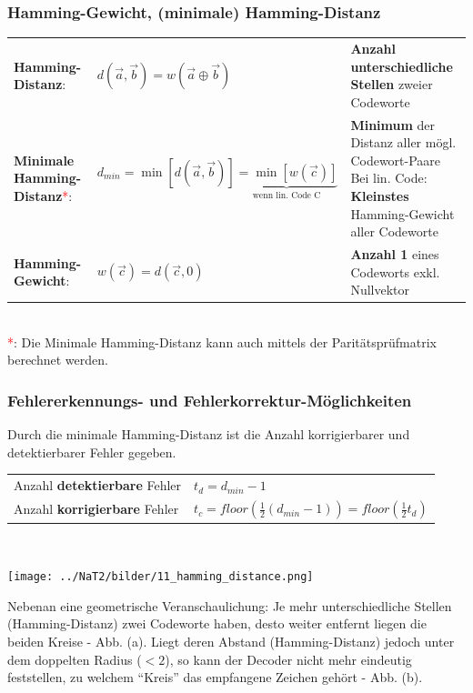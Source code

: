\subsubsection{Hamming-Gewicht, (minimale) Hamming-Distanz}
\renewcommand{\arraystretch}{1.4}
\begin{tabular}[c]{ p{5.0cm}  p{5.0cm} p{9cm} }
	\textbf{Hamming-Distanz}:
	& $d(\vec{a},\vec{b}) = w(\vec{a} \oplus \vec{b})$
	& \textbf{Anzahl unterschiedliche Stellen} zweier Codeworte \\
	\textbf{Minimale Hamming-Distanz}\textcolor{red}{*}:
	& $d_{min} = \min[d(\vec{a},\vec{b})] \underbrace{= \min{[w(\vec{c})]}}_{\text{wenn lin. Code C}}$
	& \parbox[c]{9cm}{\textbf{Minimum} der Distanz aller mögl. Codewort-Paare\\
	Bei lin. Code: \textbf{Kleinstes} Hamming-Gewicht aller Codeworte} \\
	\textbf{Hamming-Gewicht}: 
	& $w(\vec{c}) = d(\vec{c},0)$
	& \textbf{Anzahl 1} eines Codeworts exkl. Nullvektor
\end{tabular}
\renewcommand{\arraystretch}{1} \\
\textcolor{red}{*}: Die Minimale Hamming-Distanz kann auch mittels der Paritätsprüfmatrix
 berechnet werden.


\subsubsection{Fehlererkennungs- und Fehlerkorrektur-Möglichkeiten}
Durch die minimale Hamming-Distanz ist die Anzahl korrigierbarer und detektierbarer Fehler
gegeben. \\
\renewcommand{\arraystretch}{1.4}
\begin{tabular}[c]{ p{5.5cm}  p{13cm} }
	Anzahl \textbf{detektierbare} Fehler & $t_d = d_{min} - 1$ \\
	Anzahl \textbf{korrigierbare} Fehler & $t_c = floor(\frac12 (d_{min} - 1)) = floor(\frac12 t_d) $
\end{tabular}
\renewcommand{\arraystretch}{1} \\

\begin{minipage}{7.5cm}
	\texttt{[image: ../NaT2/bilder/11\_hamming\_distance.png]}
\end{minipage}
\begin{minipage}{11.5cm}
	Nebenan eine geometrische Veranschaulichung: Je mehr unterschiedliche Stellen (Hamming-Distanz)
	zwei Codeworte haben, desto weiter entfernt liegen die beiden Kreise - Abb. (a). Liegt deren
	Abstand (Hamming-Distanz) jedoch unter dem doppelten Radius ($< 2$), so kann der Decoder nicht mehr
	eindeutig feststellen, zu welchem ``Kreis'' das empfangene Zeichen gehört - Abb. (b).
\end{minipage} 

